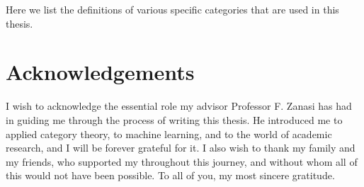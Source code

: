 \documentclass[12pt,a4paper,openright,twoside]{report}
\theoremstyle{plain}
\theoremstyle{definition}
\begin{document}
Here we list the definitions of various specific categories that are used in this thesis.








\chapter*{Acknowledgements}

\thispagestyle{empty}

I wish to acknowledge the essential role my advisor Professor F. Zanasi has had in guiding me through the process of writing this thesis. He introduced me to applied category theory, to machine learning, and to the world of academic research, and I will be forever grateful for it. I also wish to thank my family and my friends, who supported my throughout this journey, and without whom all of this would not have been possible. To all of you, my most sincere gratitude.
\end{document}
